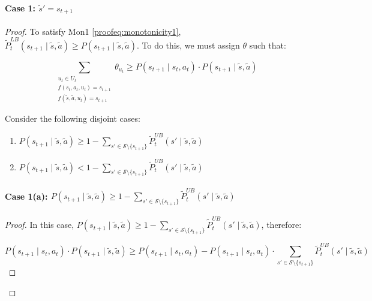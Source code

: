 \paragraph{Case 1: $\tilde{s}' = s_{t+1}$}
\noindent
\begin{proof}
    To satisfy Mon1 \eqref{proofeq:monotonicity1}, $\tilde{P}_t^{LB}(s_{t+1} \mid \tilde{s}, \tilde{a}) \geq P(s_{t+1} \mid \tilde{s}, \tilde{a})$. To do this, we must assign $\theta$ such that:

    \begin{equation}
        \label{eq:overlapping constraint 9}
        \sum_{\substack{u_t \in U_t\\f(s_t, a_t, u_t) = s_{t+1}\\f(\tilde{s}, \tilde{a}, u_t) = s_{t+1}}}\theta_{u_t}\geq P(s_{t+1} \mid s_t, a_t) \cdot P(s_{t+1} \mid \tilde{s}, \tilde{a})
    \end{equation}
    
    Consider the following disjoint cases:

    \begin{enumerate}
        \item $P(s_{t+1} \mid \tilde{s}, \tilde{a}) \geq 1 - \sum_{s' \in \mathcal{S}\setminus\{s_{t+1}\}}{\tilde{P}_{t}^{UB}(s' \mid \tilde{s}, \tilde{a})}$
        \item $P(s_{t+1} \mid \tilde{s}, \tilde{a}) < 1 - \sum_{s' \in \mathcal{S}\setminus\{s_{t+1}\}}{\tilde{P}_{t}^{UB}(s' \mid \tilde{s}, \tilde{a})}$
    \end{enumerate}

    \paragraph{Case 1(a): $P(s_{t+1} \mid \tilde{s}, \tilde{a}) \geq 1 - \sum_{s' \in \mathcal{S}\setminus\{s_{t+1}\}}{\tilde{P}_{t}^{UB}(s' \mid \tilde{s}, \tilde{a})}$}
\noindent
    \begin{proof}

    In this case, $P(s_{t+1} \mid \tilde{s}, \tilde{a}) \geq 1 - \sum_{s' \in \mathcal{S}\setminus\{s_{t+1}\}}{\tilde{P}_{t}^{UB}(s' \mid \tilde{s}, \tilde{a})}$, therefore:

    \begin{equation}
        \label{eq: lbcase1a}
        P(s_{t+1} \mid s_t, a_t) \cdot P(s_{t+1} \mid \tilde{s}, \tilde{a}) \geq P(s_{t+1} \mid s_t, a_t) - P(s_{t+1} \mid s_t, a_t) \cdot \sum_{s' \in \mathcal{S}\setminus\{s_{t+1}\}}{\tilde{P}_{t}^{UB}(s' \mid \tilde{s}, \tilde{a})}
    \end{equation}
    

\end{proof}
\end{proof}
